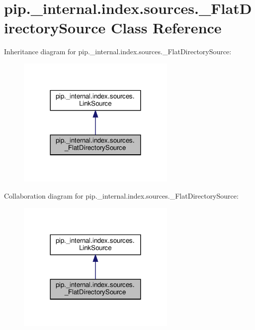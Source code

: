 \hypertarget{classpip_1_1__internal_1_1index_1_1sources_1_1__FlatDirectorySource}{}\section{pip.\+\_\+internal.\+index.\+sources.\+\_\+\+Flat\+Directory\+Source Class Reference}
\label{classpip_1_1__internal_1_1index_1_1sources_1_1__FlatDirectorySource}


Inheritance diagram for pip.\+\_\+internal.\+index.\+sources.\+\_\+\+Flat\+Directory\+Source\+:
\nopagebreak
\begin{figure}[H]
\begin{center}
\leavevmode
\includegraphics[width=216pt]{classpip_1_1__internal_1_1index_1_1sources_1_1__FlatDirectorySource__inherit__graph}
\end{center}
\end{figure}


Collaboration diagram for pip.\+\_\+internal.\+index.\+sources.\+\_\+\+Flat\+Directory\+Source\+:
\nopagebreak
\begin{figure}[H]
\begin{center}
\leavevmode
\includegraphics[width=216pt]{classpip_1_1__internal_1_1index_1_1sources_1_1__FlatDirectorySource__coll__graph}
\end{center}
\end{figure}
